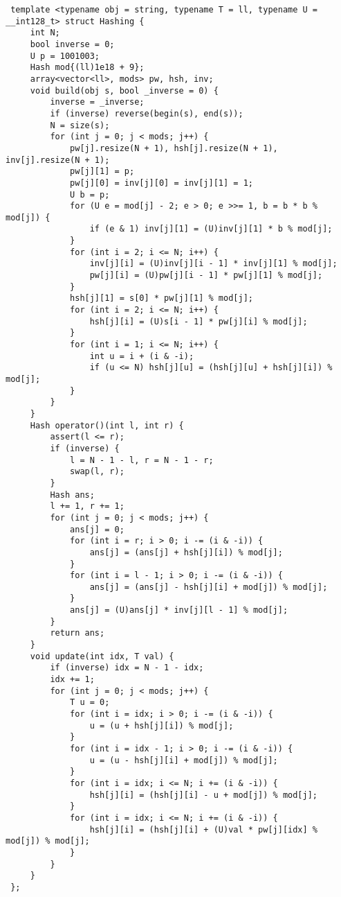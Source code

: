 \documentclass[11pt, a4paper, twoside]{article}
\begin{document}
\begin{lstlisting}
 template <typename obj = string, typename T = ll, typename U = __int128_t> struct Hashing {
     int N;
     bool inverse = 0;
     U p = 1001003;
     Hash mod{(ll)1e18 + 9};
     array<vector<ll>, mods> pw, hsh, inv;
     void build(obj s, bool _inverse = 0) {
         inverse = _inverse;
         if (inverse) reverse(begin(s), end(s));
         N = size(s);
         for (int j = 0; j < mods; j++) {
             pw[j].resize(N + 1), hsh[j].resize(N + 1), inv[j].resize(N + 1);
             pw[j][1] = p;
             pw[j][0] = inv[j][0] = inv[j][1] = 1;
             U b = p;
             for (U e = mod[j] - 2; e > 0; e >>= 1, b = b * b % mod[j]) {
                 if (e & 1) inv[j][1] = (U)inv[j][1] * b % mod[j];
             }
             for (int i = 2; i <= N; i++) {
                 inv[j][i] = (U)inv[j][i - 1] * inv[j][1] % mod[j];
                 pw[j][i] = (U)pw[j][i - 1] * pw[j][1] % mod[j];
             }
             hsh[j][1] = s[0] * pw[j][1] % mod[j];
             for (int i = 2; i <= N; i++) {
                 hsh[j][i] = (U)s[i - 1] * pw[j][i] % mod[j];
             }
             for (int i = 1; i <= N; i++) {
                 int u = i + (i & -i);
                 if (u <= N) hsh[j][u] = (hsh[j][u] + hsh[j][i]) % mod[j];
             }
         }
     }
     Hash operator()(int l, int r) {
         assert(l <= r);
         if (inverse) {
             l = N - 1 - l, r = N - 1 - r;
             swap(l, r);
         }
         Hash ans;
         l += 1, r += 1;
         for (int j = 0; j < mods; j++) {
             ans[j] = 0;
             for (int i = r; i > 0; i -= (i & -i)) {
                 ans[j] = (ans[j] + hsh[j][i]) % mod[j];
             }
             for (int i = l - 1; i > 0; i -= (i & -i)) {
                 ans[j] = (ans[j] - hsh[j][i] + mod[j]) % mod[j];
             }
             ans[j] = (U)ans[j] * inv[j][l - 1] % mod[j];
         }
         return ans;
     }
     void update(int idx, T val) {
         if (inverse) idx = N - 1 - idx;
         idx += 1;
         for (int j = 0; j < mods; j++) {
             T u = 0;
             for (int i = idx; i > 0; i -= (i & -i)) {
                 u = (u + hsh[j][i]) % mod[j];
             }
             for (int i = idx - 1; i > 0; i -= (i & -i)) {
                 u = (u - hsh[j][i] + mod[j]) % mod[j];
             }
             for (int i = idx; i <= N; i += (i & -i)) {
                 hsh[j][i] = (hsh[j][i] - u + mod[j]) % mod[j];
             }
             for (int i = idx; i <= N; i += (i & -i)) {
                 hsh[j][i] = (hsh[j][i] + (U)val * pw[j][idx] % mod[j]) % mod[j];
             }
         }
     }
 };
\end{lstlisting}
\end{document}
